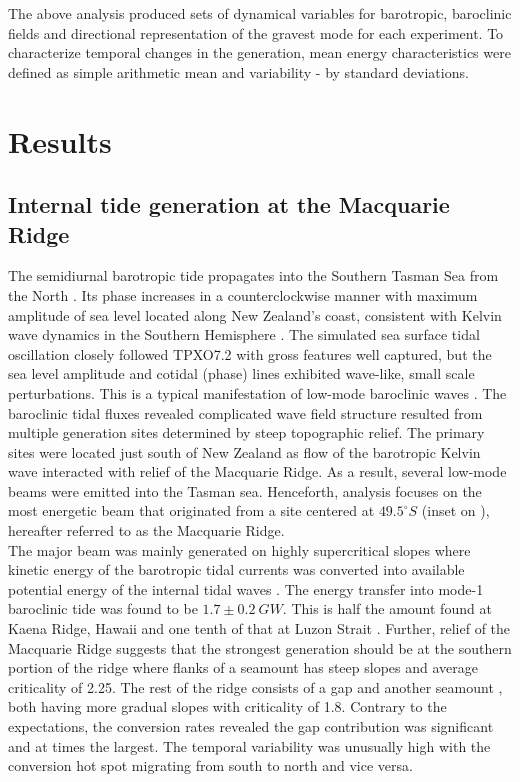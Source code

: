 \documentclass[12pt]{article}
\begin{document}
The above analysis produced sets of dynamical variables for barotropic, baroclinic 
fields and directional representation of the gravest mode for each experiment. To characterize 
temporal changes in the generation, mean energy characteristics were defined as simple arithmetic 
mean and variability - by standard deviations.

\newpage
\section{Results}
\subsection{Internal tide generation at the Macquarie Ridge}
\label{C3.sec:main_res}
The semidiurnal barotropic tide propagates into the Southern Tasman Sea from the North 
. Its phase increases in a counterclockwise manner with maximum amplitude of sea 
level located along New Zealand's coast, consistent with Kelvin wave dynamics in the Southern 
Hemisphere \citep{walters2001ocean}. The simulated sea surface tidal oscillation closely followed 
TPXO7.2 with 
gross 
features well captured, but the sea level amplitude and cotidal (phase) lines exhibited wave-like, 
small scale perturbations. This is a typical manifestation of low-mode baroclinic waves 
\citep{niwa2004three}. The baroclinic tidal fluxes  revealed complicated wave 
field structure resulted from 
multiple generation sites determined by steep topographic relief. The primary sites were located  
just south of New Zealand as flow of the barotropic Kelvin wave interacted with relief of the 
Macquarie Ridge. As a result, several low-mode beams \citep{rainville2010interference} were emitted 
into the Tasman 
sea. Henceforth, analysis focuses on the most energetic beam that originated from a site centered 
at 
$49.5^{\circ}S$ (inset on ), hereafter referred to as the Macquarie 
Ridge.\\

The major beam was mainly generated on highly supercritical slopes where kinetic energy of the 
barotropic tidal currents was converted into available potential energy of the internal tidal 
waves . The energy transfer into mode-1 baroclinic tide was found to be $1.7 
\pm 0.2~GW$. 
This is half the amount found at Kaena Ridge, Hawaii \citep{carter2008energetics} and one tenth of 
that at Luzon Strait \citep{alford2011energy, kerry2014impact}. Further, relief of 
the Macquarie Ridge suggests that the strongest generation should be at the southern portion of the 
ridge where flanks of a seamount has steep slopes and average criticality of 2.25. The rest of the 
ridge consists of a gap and another seamount , both 
having more gradual slopes with criticality of 1.8. Contrary to the expectations, 
the conversion rates  revealed the gap contribution was significant and 
at times the largest. The temporal variability was unusually high with the conversion hot spot 
migrating from south to north and vice versa.\\
\end{document}
